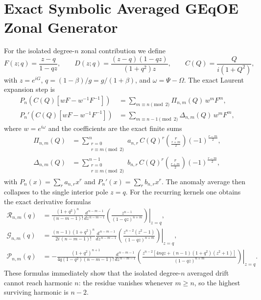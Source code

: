 \documentclass[10pt]{article}
\begin{document}
\small
\section*{Exact Symbolic Averaged GEqOE Zonal Generator}
For the isolated degree-$n$ zonal contribution we define
\begin{equation}
F(z;q)=\frac{z-q}{1-qz}, \qquad
D(z;q)=\frac{(z-q)(1-qz)}{(1+q^2)z}, \qquad
C(Q)=\frac{Q}{i(1+Q^2)},
\end{equation}
with $z=e^{iG}$, $q=(1-\beta)/g=g/(1+\beta)$, and $\omega=\Psi-\Omega$.
The exact Laurent expansion step is
\begin{align}
P_n\!\left(C(Q)\left[wF-w^{-1}F^{-1}\right]\right) &= \sum_{m\equiv n\!\!\!\!\pmod{2}} \Pi_{n,m}(Q)\,w^m F^m,\\
P_n'\!\left(C(Q)\left[wF-w^{-1}F^{-1}\right]\right) &= \sum_{m\equiv n-1\!\!\!\!\pmod{2}} \Delta_{n,m}(Q)\,w^m F^m,
\end{align}
where $w=e^{i\omega}$ and the coefficients are the exact finite sums
\begin{align}
\Pi_{n,m}(Q) &= \sum_{\substack{r=0\\ r\equiv m\!\!\!\!\pmod{2}}}^{n}
a_{n,r}\,C(Q)^r
\binom{r}{\frac{r+m}{2}}(-1)^{\frac{r-m}{2}},\\
\Delta_{n,m}(Q) &= \sum_{\substack{r=0\\ r\equiv m\!\!\!\!\pmod{2}}}^{n-1}
b_{n,r}\,C(Q)^r
\binom{r}{\frac{r+m}{2}}(-1)^{\frac{r-m}{2}},
\end{align}
with $P_n(x)=\sum_r a_{n,r}x^r$ and $P_n'(x)=\sum_r b_{n,r}x^r$.
The anomaly average then collapses to the single interior pole $z=q$.
For the recurring kernels one obtains the exact derivative formulas
\begin{align}
\mathcal{R}_{n,m}(q) &= \frac{(1+q^2)^n}{(n-m-1)!}
\left.\frac{d^{\,n-m-1}}{dz^{\,n-m-1}}\left(\frac{z^{n-1}}{(1-qz)^{n+m}}\right)\right|_{z=q},\\
\mathcal{G}_{n,m}(q) &= \frac{(n-1)(1+q^2)^n}{2i\,(n-m-1)!}
\left.\frac{d^{\,n-m-1}}{dz^{\,n-m-1}}\left(\frac{z^{n-2}(z^2-1)}{(1-qz)^{n+m}}\right)\right|_{z=q},\\
\mathcal{P}_{n,m}(q) &= -\frac{(1+q^2)^{n+1}}{4q(1-q^2)(n-m-1)!}
\left.\frac{d^{\,n-m-1}}{dz^{\,n-m-1}}
\left(\frac{z^{n-2}\left[4nqz+(n-1)(1+q^2)(z^2+1)\right]}{(1-qz)^{n+m}}\right)\right|_{z=q}.
\end{align}
These formulas immediately show that the isolated degree-$n$ averaged drift cannot reach harmonic $n$:
the residue vanishes whenever $m\ge n$, so the highest surviving harmonic is $n-2$.
\end{document}
